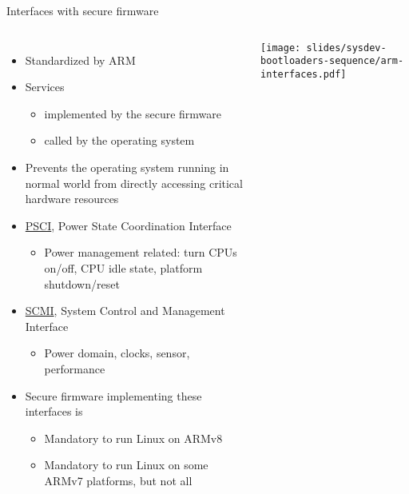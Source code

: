 \begin{frame}{Interfaces with secure firmware}
  \begin{columns}[T]
    \begin{itemize}
    \item Standardized by ARM
    \item Services
      \begin{itemize}
      \item implemented by the secure firmware
      \item called by the operating system
      \end{itemize}
    \item Prevents the operating system running in normal world from
      directly accessing critical hardware resources
    \item
      \href{http://infocenter.arm.com/help/topic/com.arm.doc.den0022d/Power_State_Coordination_Interface_PDD_v1_1_DEN0022D.pdf}{PSCI},
      Power State Coordination Interface
      \begin{itemize}
      \item Power management related: turn CPUs on/off, CPU idle state,
        platform shutdown/reset
      \end{itemize}
    \item
      \href{http://infocenter.arm.com/help/topic/com.arm.doc.den0056a/DEN0056A_System_Control_and_Management_Interface.pdf}{SCMI},
      System Control and Management Interface
      \begin{itemize}
      \item Power domain, clocks, sensor, performance
      \end{itemize}
    \item Secure firmware implementing these interfaces is
      \begin{itemize}
      \item Mandatory to run Linux on ARMv8
      \item Mandatory to run Linux on some ARMv7 platforms, but not all
      \end{itemize}
    \end{itemize}
    \texttt{[image: slides/sysdev-bootloaders-sequence/arm-interfaces.pdf]}
  \end{columns}
\end{frame}

